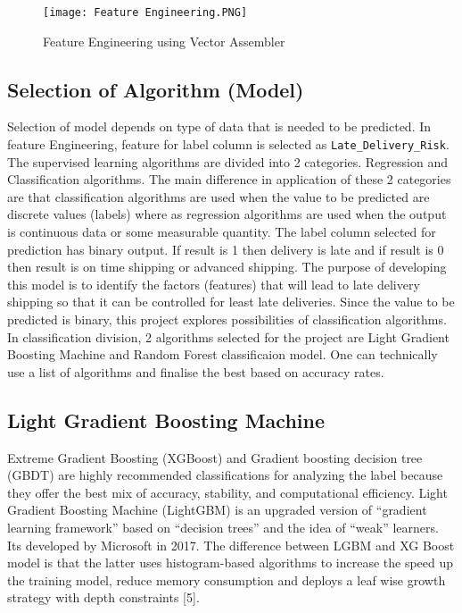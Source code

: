 \documentclass[journal,twoside,web]{ieeecolor}
\begin{document}
\begin{figure}[htbp]
\centerline{\texttt{[image: Feature Engineering.PNG]}}
\caption{Feature Engineering using Vector Assembler}
\label{fig12 }
\end{figure}

\subsection{Selection of Algorithm (Model)} 
Selection of model depends on type of data that is needed to be predicted. In feature Engineering, feature for label column is selected as \texttt{Late\_Delivery\_Risk}. 
The supervised learning algorithms are divided into 2 categories. Regression and Classification algorithms. The main difference in application of these 2 categories are that classification algorithms are used when the value to be predicted are discrete values (labels) where as regression algorithms are used when the output is continuous data or some measurable quantity. The label column selected for prediction has binary output. If result is 1 then delivery is late and if result is 0 then result is on time shipping or advanced shipping. The purpose of  developing this model is to identify the factors (features) that will lead to late delivery shipping so that it can be controlled for least late deliveries. Since the value to be predicted is binary, this project explores possibilities of classification algorithms. In classification division, 2 algorithms selected for the project are  Light Gradient Boosting Machine and Random Forest classificaion model. One can technically use a list of algorithms and finalise the best based on accuracy rates.

\subsection{Light Gradient Boosting Machine} 
Extreme Gradient Boosting (XGBoost) and Gradient boosting decision tree (GBDT) are highly recommended classifications for analyzing the label because they offer the best mix of accuracy, stability, and computational efficiency. Light Gradient Boosting Machine (LightGBM) is an upgraded version of “gradient learning framework” based on “decision trees” and the idea of “weak” learners. Its developed by Microsoft in 2017. The difference between LGBM and XG Boost model is that the latter uses histogram-based algorithms to increase the speed up the training model, reduce memory consumption and deploys a leaf wise growth strategy with depth constraints [5]. 
\end{document}
